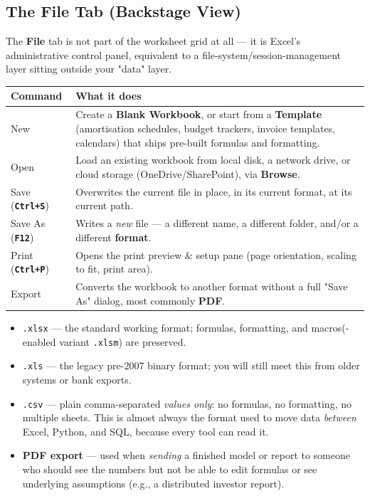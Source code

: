 \documentclass[11pt,a4paper]{article}
\newcommand{\key}[1]{\texttt{\colorbox{black!8}{\textbf{#1}}}}
\begin{document}
\subsection{The File Tab (Backstage View)}

The \textbf{File} tab is not part of the worksheet grid at all --- it is Excel's administrative control panel, equivalent to a file-system/session-management layer sitting outside your "data" layer.

\begin{center}
\begin{tabular}{@{}p{2.6cm}p{9.6cm}@{}}
\toprule
\textbf{Command} & \textbf{What it does} \\
\midrule
New & Create a \textbf{Blank Workbook}, or start from a \textbf{Template} (amortisation schedules, budget trackers, invoice templates, calendars) that ships pre-built formulas and formatting. \\
Open & Load an existing workbook from local disk, a network drive, or cloud storage (OneDrive/SharePoint), via \textbf{Browse}. \\
Save (\key{Ctrl+S}) & Overwrites the current file in place, in its current format, at its current path. \\
Save As (\key{F12}) & Writes a \emph{new} file --- a different name, a different folder, and/or a different \textbf{format}. \\
Print (\key{Ctrl+P}) & Opens the print preview \& setup pane (page orientation, scaling to fit, print area). \\
Export & Converts the workbook to another format without a full "Save As" dialog, most commonly \textbf{PDF}. \\
\bottomrule
\end{tabular}
\end{center}

\begin{financeapp}
\begin{itemize}
  \item \texttt{.xlsx} --- the standard working format; formulas, formatting, and macros(-enabled variant \texttt{.xlsm}) are preserved.
  \item \texttt{.xls} --- the legacy pre-2007 binary format; you will still meet this from older systems or bank exports.
  \item \texttt{.csv} --- plain comma-separated \emph{values only}: no formulas, no formatting, no multiple sheets. This is almost always the format used to move data \emph{between} Excel, Python, and SQL, because every tool can read it.
  \item \textbf{PDF export} --- used when \emph{sending} a finished model or report to someone who should see the numbers but not be able to edit formulas or see underlying assumptions (e.g., a distributed investor report).
\end{itemize}
\end{financeapp}
\end{document}
